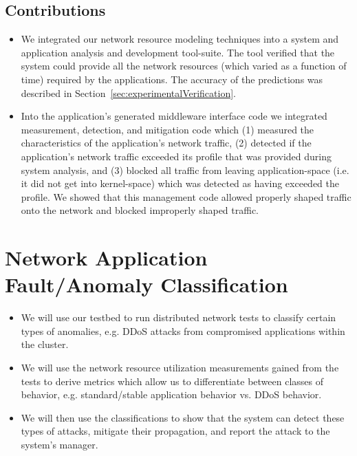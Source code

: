 \subsection{Contributions}
\begin{itemize}
	\item We integrated our network resource modeling techniques
          into a system and application analysis and development
          tool-suite. The tool verified that the system could provide
          all the network resources (which varied as a function of
          time) required by the applications.  The accuracy of the
          predictions was described in
          Section~\ref{sec:experimentalVerification}.
	\item Into the application's generated middleware interface
          code we integrated measurement, detection, and mitigation
          code which (1) measured the characteristics of the
          application's network traffic, (2) detected if the
          application's network traffic exceeded its profile that was
          provided during system analysis, and (3) blocked all traffic
          from leaving application-space (i.e. it did not get into
          kernel-space) which was detected as having exceeded the
          profile.  We showed that this management code allowed
          properly shaped traffic onto the network and blocked
          improperly shaped traffic.
\end{itemize}

\section{Network Application Fault/Anomaly Classification}
\label{sec:classification}

\begin{itemize}
	\item We will use our testbed to run distributed network tests
          to classify certain types of anomalies, e.g. DDoS attacks
          from compromised applications within the cluster.
	\item We will use the network resource utilization
          measurements gained from the tests to derive metrics which
          allow us to differentiate between classes of behavior,
          e.g. standard/stable application behavior vs. DDoS behavior.
	\item We will then use the classifications to show that the
          system can detect these types of attacks, mitigate their
          propagation, and report the attack to the system's manager.
\end{itemize}

\fi
